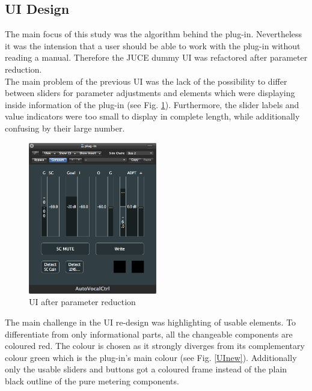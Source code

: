 \subsection{UI Design}

The main focus of this study was the algorithm behind the plug-in. Nevertheless it was the intension that a user should be able to work with the plug-in without reading a manual. Therefore the JUCE dummy UI was refactored after parameter reduction.\\
The main problem of the previous UI was the lack of the possibility to differ between sliders for parameter adjustments and elements which were displaying inside information of the plug-in (see Fig. \ref{UIold}). Furthermore, the slider labels and value indicators were too small to display in complete length, while additionally confusing by their large number.\\

\begin{figure}[H]
\includegraphics[width=0.5\textwidth]{images/designVorher}
	\centering
	\caption{UI after parameter reduction}
	\label{UIold}
\end{figure}

The main challenge in the UI re-design was highlighting of usable elements. To differentiate from only informational parts, all the changeable components are coloured red. The colour is chosen as it strongly diverges from its complementary colour green which is the plug-in’s main colour (see Fig. \ref{UInew}). Additionally only the usable sliders and buttons got a coloured frame instead of the plain black outline of the pure metering components.\\

